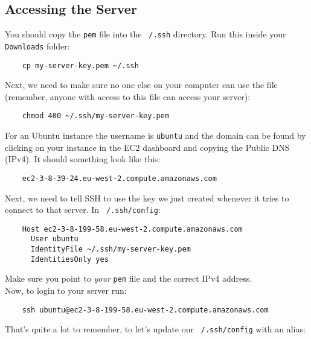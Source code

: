 


\subsection{Accessing the Server}

You should copy the \texttt{pem} file into the \texttt{~/.ssh} directory. Run this inside your \texttt{Downloads} folder:

\begin{verbatim}
    cp my-server-key.pem ~/.ssh
\end{verbatim}

Next, we need to make sure no one else on your computer can use the file (remember, anyone with access to this file can access your server):

\begin{verbatim}
    chmod 400 ~/.ssh/my-server-key.pem
\end{verbatim}

For an Ubuntu instance the username is \texttt{ubuntu} and the domain can be found by clicking on your instance in the EC2 dashboard and copying the Public DNS (IPv4). It should something look like this:

\begin{verbatim}
    ec2-3-8-39-24.eu-west-2.compute.amazonaws.com
\end{verbatim}

Next, we need to tell SSH to use the key we just created whenever it tries to connect to that server. In \texttt{~/.ssh/config}:

\begin{verbatim}
    Host ec2-3-8-199-58.eu-west-2.compute.amazonaws.com
      User ubuntu
      IdentityFile ~/.ssh/my-server-key.pem
      IdentitiesOnly yes
\end{verbatim}

Make sure you point to \textit{your} \texttt{pem} file and the correct IPv4 address.
\\

Now, to login to your server run:

\begin{verbatim}
    ssh ubuntu@ec2-3-8-199-58.eu-west-2.compute.amazonaws.com
\end{verbatim}

That's quite a lot to remember, to let's update our \texttt{~/.ssh/config} with an alias:

